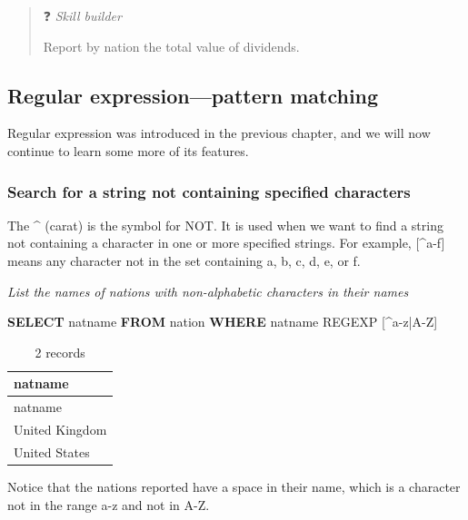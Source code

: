 \documentclass[
]{article}
\newenvironment{Shaded}{\begin{snugshade}}{\end{snugshade}}
\newcommand{\KeywordTok}[1]{\textcolor[rgb]{0.13,0.29,0.53}{\textbf{#1}}}
\newcommand{\NormalTok}[1]{#1}
\newcommand{\StringTok}[1]{\textcolor[rgb]{0.31,0.60,0.02}{#1}}
\begin{document}
\begin{quote}
❓ \emph{Skill builder}

Report by nation the total value of dividends.
\end{quote}

\hypertarget{regular-expressionpattern-matching-1}{%
\subsection{Regular expression---pattern
matching}\label{regular-expressionpattern-matching-1}}

Regular expression was introduced in the previous chapter, and we will
now continue to learn some more of its features.

\hypertarget{search-for-a-string-not-containing-specified-characters}{%
\subsubsection{Search for a string not containing specified
characters}\label{search-for-a-string-not-containing-specified-characters}}

The \^{} (carat) is the symbol for NOT. It is used when we want to find
a string not containing a character in one or more specified strings.
For example, {[}\^{}a-f{]} means any character not in the set containing
a, b, c, d, e, or f.

\emph{List the names of nations with non-alphabetic characters in their
names}

\begin{Shaded}
\begin{Highlighting}[]
\KeywordTok{SELECT}\NormalTok{ natname }\KeywordTok{FROM}\NormalTok{ nation }\KeywordTok{WHERE}\NormalTok{ natname REGEXP }\StringTok{\textquotesingle{}[\^{}a{-}z|A{-}Z]\textquotesingle{}}
\end{Highlighting}
\end{Shaded}

\begin{longtable}[]{@{}l@{}}
\caption{2 records}\tabularnewline
\toprule()
natname \\
\midrule()
\endfirsthead
\toprule()
natname \\
\midrule()
\endhead
United Kingdom \\
United States \\
\bottomrule()
\end{longtable}

Notice that the nations reported have a space in their name, which is a
character not in the range a-z and not in A-Z.
\end{document}
